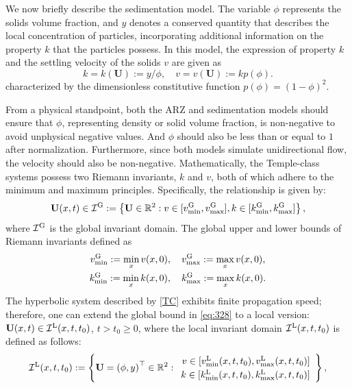 \documentclass[times,final,11pt]{elsarticle}
\numberwithin{equation}{section}
\theoremstyle{definition}
\theoremstyle{remark}
\newcommand{\BU}{\mathbf{U}}
\begin{document}
We now briefly describe the sedimentation model. The variable $\phi$ represents the solids volume fraction, and $y$ denotes a conserved quantity that describes the local concentration of particles, incorporating additional information on the property $k$ that the particles possess. In this model, the expression of property $k$ and the settling velocity of the solids $v$ are given as
\begin{equation*} 
	\label{kv2}
	k = k(\mathbf{U}) := y/\phi, \quad v = v(\mathbf{U}) := kp(\phi).
\end{equation*}
characterized by the dimensionless constitutive function $p(\phi) = (1 - \phi)^2$. 

From a physical standpoint, both the ARZ and sedimentation models should ensure that $\phi$, representing density or solid volume fraction, is non-negative to avoid unphysical negative values. And $\phi$ should also be less than or equal to $1$ after normalization. Furthermore, since both models simulate unidirectional flow, the velocity should also be non-negative. Mathematically, the Temple-class systems possess two Riemann invariants, $k$ and $v$, both of which adhere to the minimum and maximum principles. Specifically, the relationship is given by:
\begin{equation}\label{eq:328}
	\BU(x,t) \in \mathcal{I}^{\rm G} := 
	\left\{ 
	\BU
	\in \mathbb{R}^2 
	: 
	v \in [v^{\rm G}_{\min}, v^{\rm G}_{\max}], 
	k \in [k^{\rm G}_{\min}, k^{\rm G}_{\max}]
	\right\},
\end{equation}
where $\mathcal{I}^{\rm G}$ is the global invariant domain. The global upper and lower bounds of Riemann invariants defined as
\begin{equation*}\label{eq:387}
\begin{gathered}
	v^{\rm G}_{\min} := \min_x v(x,0), \quad v^{\rm G}_{\max} := \max_x v(x,0),\\
	k^{\rm G}_{\min} := \min_x k(x,0), \quad k^{\rm G}_{\max} := \max_x k(x,0). 
\end{gathered}
\end{equation*}
The hyperbolic system described by \eqref{TC} exhibits finite propagation speed; therefore, one can extend the global bound in \eqref{eq:328} to a local version:
$\BU(x,t) \in \mathcal{I}^{\rm L}(x,t,t_0)$, $t > t_0 \geq 0$,
where the local invariant domain $\mathcal{I}^{\rm L}(x,t,t_0)$ is defined as follows:
\begin{equation}\label{eq:154}
	\mathcal{I}^{\rm L}(x,t,t_0)
	:=
	\left\{ 
	\BU= \left( \phi, y \right)^\top \in \mathbb{R}^2 
	: 
	\renewcommand\arraystretch{1.2}
	\begin{array}{r}
		v \in [v^{\rm L}_{\min}(x,t,t_0), v^{\rm L}_{\max}(x,t,t_0)] \\  
		k \in [k^{\rm L}_{\min}(x,t,t_0), k^{\rm L}_{\max}(x,t,t_0)] 
	\end{array}
	\right\},
\end{equation}
\end{document}
